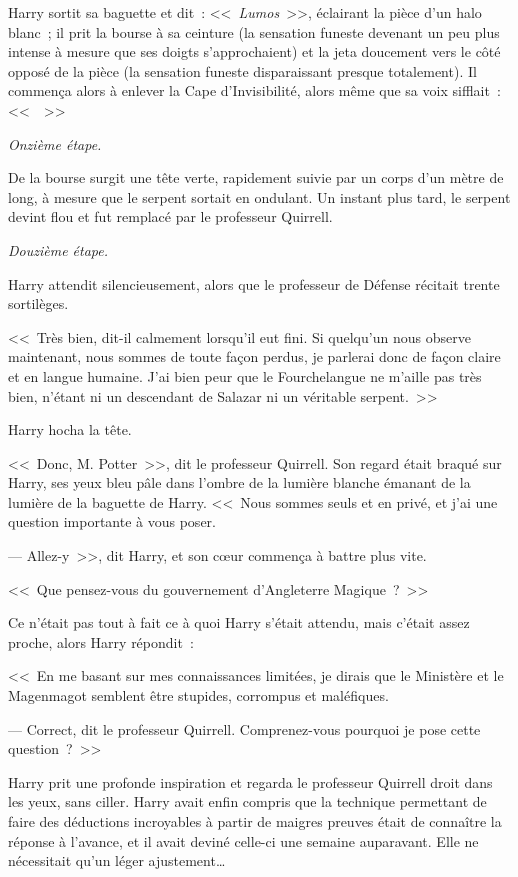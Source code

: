 Harry sortit sa baguette et dit~: <<~\emph{Lumos}~>>, éclairant la pièce d'un halo blanc~; il prit la bourse à sa ceinture (la sensation funeste devenant un peu plus intense à mesure que ses doigts s'approchaient) et la jeta doucement vers le côté opposé de la pièce (la sensation funeste disparaissant presque totalement). Il commença alors à enlever la Cape d'Invisibilité, alors même que sa voix sifflait~: <<~~>>

\emph{Onzième étape.}

De la bourse surgit une tête verte, rapidement suivie par un corps d'un mètre de long, à mesure que le serpent sortait en ondulant. Un instant plus tard, le serpent devint flou et fut remplacé par le professeur Quirrell.

\emph{Douzième étape.}

Harry attendit silencieusement, alors que le professeur de Défense récitait trente sortilèges.

<<~Très bien, dit-il calmement lorsqu'il eut fini. Si quelqu'un nous observe maintenant, nous sommes de toute façon perdus, je parlerai donc de façon claire et en langue humaine. J'ai bien peur que le Fourchelangue ne m'aille pas très bien, n'étant ni un descendant de Salazar ni un véritable serpent.~>>

Harry hocha la tête.

<<~Donc, M. Potter~>>, dit le professeur Quirrell. Son regard était braqué sur Harry, ses yeux bleu pâle dans l'ombre de la lumière blanche émanant de la lumière de la baguette de Harry. <<~Nous sommes seuls et en privé, et j'ai une question importante à vous poser.

--- Allez-y~>>, dit Harry, et son cœur commença à battre plus vite.

<<~Que pensez-vous du gouvernement d'Angleterre Magique~?~>>

Ce n'était pas tout à fait ce à quoi Harry s'était attendu, mais c'était assez proche, alors Harry répondit~:

<<~En me basant sur mes connaissances limitées, je dirais que le Ministère et le Magenmagot semblent être stupides, corrompus et maléfiques.

--- Correct, dit le professeur Quirrell. Comprenez-vous pourquoi je pose cette question~?~>>

Harry prit une profonde inspiration et regarda le professeur Quirrell droit dans les yeux, sans ciller. Harry avait enfin compris que la technique permettant de faire des déductions incroyables à partir de maigres preuves était de connaître la réponse à l'avance, et il avait deviné celle-ci une semaine auparavant. Elle ne nécessitait qu'un léger ajustement…

